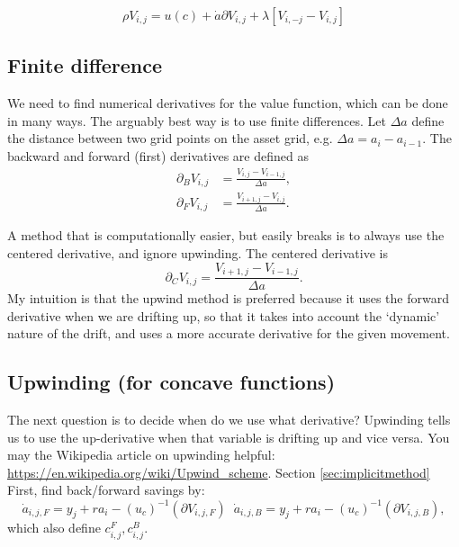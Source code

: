 \documentclass[12pt]{article}
\DeclareMathOperator{\1}{\mathbbm{1}}
\begin{document}
\begin{equation}
\rho V_{i,j} =u(c) + \dot a \partial V_{i,j} + \lambda [V_{i,-j} - V_{i,j}]
\end{equation}

\subsection{Finite difference}
We need to find numerical derivatives for the value function, which can be done in many ways. The arguably best way is to use finite differences. Let $\Delta a$ define the distance between two grid points on the asset grid, e.g. $\Delta a=a_i-a_{i-1}$. The backward and forward (first) derivatives are defined as
	\begin{align}
	\partial_{B}V_{i,j}&=\frac{V_{i,j}-V_{i-1,j}}{\Delta a}, \label{eq:backder}\\
	\partial_{F}V_{i,j}&=\frac{V_{i+1,j}-V_{i,j}}{\Delta a}. \label{eq:forder}
	\end{align}
	
A method that is computationally easier, but easily breaks is to always use the centered derivative, and ignore upwinding. The centered derivative is
\begin{equation*}
	\partial_{C}V_{i,j}=\frac{V_{i+1,j}-V_{i-1,j}}{\Delta a}.
\end{equation*}
My intuition is that the upwind method is preferred because it uses the forward derivative when we are drifting up, so that it takes into account the `dynamic' nature of the drift, and uses a more accurate derivative for the given movement.
	
	\subsection{Upwinding (for concave functions)}
	The next question is to decide when do we use what derivative? Upwinding tells us to use the up-derivative when that variable is drifting up and vice versa. You may the Wikipedia article on upwinding helpful: \url{https://en.wikipedia.org/wiki/Upwind_scheme}. Section \ref{sec:implicitmethod} First, find back/forward savings by:
	\begin{equation}
	\dot a_{i,j,F} = y_j + r a_i -(u_c)^{-1}(\partial V_{i,j,F}) \;\; 	\dot a_{i,j,B} = y_j + r a_i -(u_c)^{-1}(\partial V_{i,j,B}),
	\end{equation}
	which also define $c_{i,j}^F,c_{i,j}^B$. 
	
\end{document}
